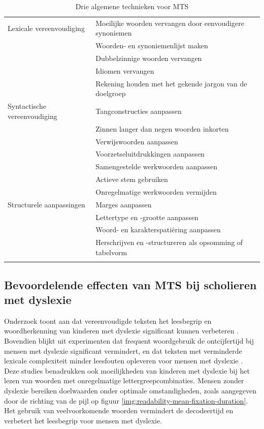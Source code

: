 \begin{center}
		\begin{table}[H]
			\begin{tabular}{ | m{4cm} | m{11cm} | } 
			\hline
			Lexicale vereenvoudiging & Moeilijke woorden vervangen door eenvoudigere synoniemen \\ 
				& Woorden- en synoniemenlijst maken \\
				& Dubbelzinnige woorden vervangen \\
				& Idiomen vervangen \\ 
				& Rekening houden met het gekende jargon van de doelgroep \\
			\hline
			Syntactische vereenvoudiging & Tangconstructies aanpassen \\
			& Zinnen langer dan negen woorden inkorten \\
			& Verwijswoorden aanpassen \\
			& Voorzetseluitdrukkingen aanpassen \\
			& Samengestelde werkwoorden aanpassen \\
			& Actieve stem gebruiken \\
			& Onregelmatige werkwoorden vermijden \\
			\hline
			Structurele aanpassingen & Marges aanpassen \\
			& Lettertype en -grootte aanpassen \\
			& Woord- en karakterspatiëring aanpassen \\
			& Herschrijven en -structureren als opsomming of tabelvorm \\
			& \\
			\hline
		\end{tabular}
		\caption{Drie algemene technieken voor MTS}
		\label{table:manual-simplification}
	\end{table}
\end{center}

\subsection{Bevoordelende effecten van MTS bij scholieren met dyslexie}

Onderzoek toont aan dat vereenvoudigde teksten het leesbegrip en woordherkenning van kinderen met dyslexie significant kunnen verbeteren \autocite{RiveroContreras2021}. Bovendien blijkt uit experimenten dat frequent woordgebruik de ontcijfertijd bij mensen met dyslexie significant vermindert, en dat teksten met verminderde lexicale complexiteit minder leesfouten opleveren voor mensen met dyslexie \autocite{Rello2013a, Gala2016}. Deze studies benadrukken ook moeilijkheden van kinderen met dyslexie bij het lezen van woorden met onregelmatige lettergreepcombinaties. Mensen zonder dyslexie bereiken doelwaarden onder optimale omstandigheden, zoals aangegeven door de richting van de pijl op figuur \ref{img:readability-mean-fixation-duration}. Het gebruik van veelvoorkomende woorden vermindert de decodeertijd en verbetert het leesbegrip voor mensen met dyslexie.


